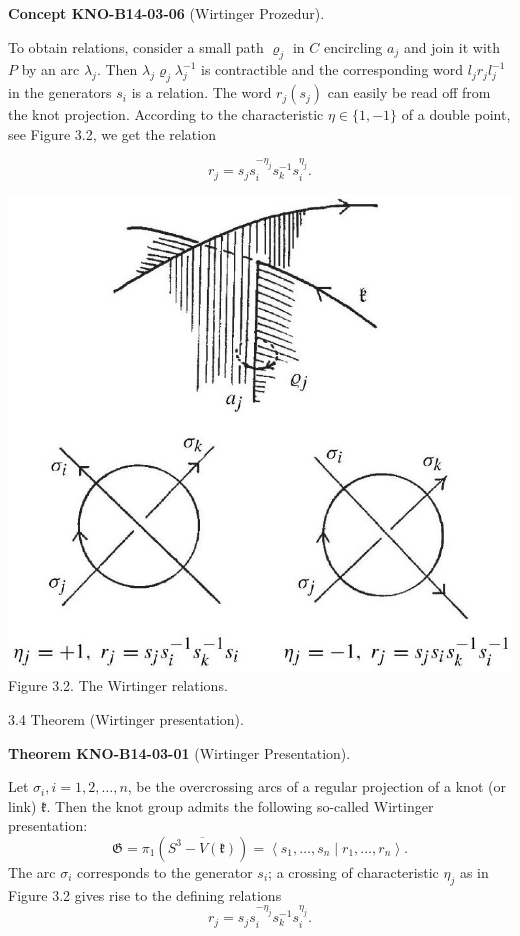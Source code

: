 \documentclass[10pt, letterpaper]{article}
\newcommand{\CustomHeading}[3]{%
  \par\medskip\noindent%
  \textbf{#1 #2} \textnormal{(#3)}.\enskip%
}
\newenvironment{THEO}[2]{\begin{unitbox}\CustomHeading{Theorem}{#1}{#2}}{\end{unitbox}}
\newenvironment{CONC}[2]{\begin{unitbox}\CustomHeading{Concept}{#1}{#2}}{\end{unitbox}}
\begin{document}
\begin{CONC}{KNO-B14-03-06}{Wirtinger Prozedur}
To obtain relations, consider a small path $\varrho_{j}$ in $C$ encircling $a_{j}$ and join it with $P$ by an arc $\lambda_{j}$. Then $\lambda_{j} \varrho_{j} \lambda_{j}^{-1}$ is contractible and the corresponding word $l_{j} r_{j} l_{j}^{-1}$ in the generators $s_{i}$ is a relation. The word $r_{j}\left(s_{j}\right)$ can easily be read off from the knot projection. According to the characteristic $\eta \in\{1,-1\}$ of a double point, see Figure 3.2, we get the relation

$$
r_{j}=s_{j} s_{i}^{-\eta_{j}} s_{k}^{-1} s_{i}^{\eta_{j}} .
$$

\includegraphics[scale=0.2,center]{2025_05_21_9c06be8de7a55410f8c1g-047}
Figure 3.2. The Wirtinger relations.
\end{CONC}


3.4 Theorem (Wirtinger presentation). 

\begin{THEO}{KNO-B14-03-01}{Wirtinger Presentation}
Let $\sigma_{i}, i=1,2, \ldots, n$, be the overcrossing arcs of a regular projection of a knot (or link) $\mathfrak{k}$. Then the knot group admits the following so-called Wirtinger presentation:
$$
\mathfrak{G}=\pi_{1}\left(\overline{S^{3}-V(\mathfrak{k})}\right)=\left\langle s_{1}, \ldots, s_{n} \mid r_{1}, \ldots, r_{n}\right\rangle .
$$
The arc $\sigma_{i}$ corresponds to the generator $s_{i}$; a crossing of characteristic $\eta_{j}$ as in Figure 3.2 gives rise to the defining relations
$$
r_{j}=s_{j} s_{i}^{-\eta_{j}} s_{k}^{-1} s_{i}^{\eta_{j}} .
$$
\end{THEO}
\end{document}
